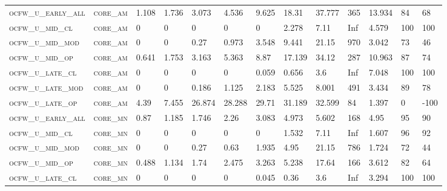 \begin{landscape}
\begin{center}
\begin{footnotesize}
\begin{longtable}{lllllllllllll}
\textsc{ocfw\_u\_early\_all} & \textsc{core\_am  }   & 1.108    & 1.736    & 3.073    & 4.536    & 9.625    & 18.31    & 37.777    & 365    & 13.934        & 84            & 68       \\
\textsc{ocfw\_u\_mid\_cl   } & \textsc{core\_am  }   & 0        & 0        & 0        & 0        & 0        & 2.278    & 7.11      & Inf    & 4.579         & 100           & 100      \\
\textsc{ocfw\_u\_mid\_mod  } & \textsc{core\_am  }   & 0        & 0        & 0.27     & 0.973    & 3.548    & 9.441    & 21.15     & 970    & 3.042         & 73            & 46       \\
\textsc{ocfw\_u\_mid\_op   } & \textsc{core\_am  }   & 0.641    & 1.753    & 3.163    & 5.363    & 8.87     & 17.139   & 34.12     & 287    & 10.963        & 87            & 74       \\
\textsc{ocfw\_u\_late\_cl  } & \textsc{core\_am  }   & 0        & 0        & 0        & 0        & 0.059    & 0.656    & 3.6       & Inf    & 7.048         & 100           & 100      \\
\textsc{ocfw\_u\_late\_mod } & \textsc{core\_am  }   & 0        & 0        & 0.186    & 1.125    & 2.183    & 5.525    & 8.001     & 491    & 3.434         & 89            & 78       \\
\textsc{ocfw\_u\_late\_op  } & \textsc{core\_am  }   & 4.39     & 7.455    & 26.874   & 28.288   & 29.71    & 31.189   & 32.599    & 84     & 1.397         & 0             & -100     \\
\textsc{ocfw\_u\_early\_all} & \textsc{core\_mn  }   & 0.87     & 1.185    & 1.746    & 2.26     & 3.083    & 4.973    & 5.602     & 168    & 4.95          & 95            & 90       \\
\textsc{ocfw\_u\_mid\_cl   } & \textsc{core\_mn  }   & 0        & 0        & 0        & 0        & 0        & 1.532    & 7.11      & Inf    & 1.607         & 96            & 92       \\
\textsc{ocfw\_u\_mid\_mod  } & \textsc{core\_mn  }   & 0        & 0        & 0.27     & 0.63     & 1.935    & 4.95     & 21.15     & 786    & 1.724         & 72            & 44       \\
\textsc{ocfw\_u\_mid\_op   } & \textsc{core\_mn  }   & 0.488    & 1.134    & 1.74     & 2.475    & 3.263    & 5.238    & 17.64     & 166    & 3.612         & 82            & 64       \\
\textsc{ocfw\_u\_late\_cl  } & \textsc{core\_mn  }   & 0        & 0        & 0        & 0        & 0.045    & 0.36     & 3.6       & Inf    & 3.294         & 100           & 100      \\

\end{longtable}
\end{footnotesize}
\end{center}
\end{landscape}
